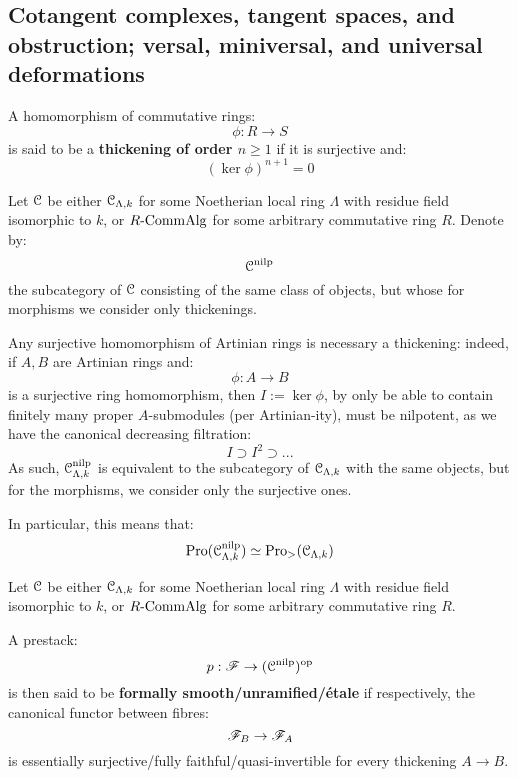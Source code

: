         \subsection{Cotangent complexes, tangent spaces, and obstruction; versal, miniversal, and universal deformations}
            \begin{definition}[Thickenings] \label{def: thickenings}
                A homomorphism of commutative rings:
                    $$\phi: R \to S$$
                is said to be a \textbf{thickening of order $n \geq 1$} if it is surjective and:
                    $$(\ker \phi)^{n + 1} = 0$$
            \end{definition}
            \begin{convention}
                Let $\mathcal{C}$ be either $\mathcal{C}_{\Lambda, k}$ for some Noetherian local ring $\Lambda$ with residue field isomorphic to $k$, or $R\text{-}\mathrm{Comm}\mathrm{Alg}$ for some arbitrary commutative ring $R$. Denote by:
                    $$\mathcal{C}^{\mathrm{nilp}}$$
                the subcategory of $\mathcal{C}$ consisting of the same class of objects, but whose for morphisms we consider only thickenings.
            \end{convention}
            \begin{remark}
                Any surjective homomorphism of Artinian rings is necessary a thickening: indeed, if $A, B$ are Artinian rings and:
                    $$\phi: A \to B$$
                is a surjective ring homomorphism, then $I := \ker \phi$, by only be able to contain finitely many proper $A$-submodules (per Artinian-ity), must be nilpotent, as we have the canonical decreasing filtration:
                    $$I \supset I^2 \supset ...$$
                As such, $\mathcal{C}_{\Lambda, k}^{\mathrm{nilp}}$ is equivalent to the subcategory of $\mathcal{C}_{\Lambda, k}$ with the same objects, but for the morphisms, we consider only the surjective ones.

                In particular, this means that:
                    $$\mathrm{Pro}(\mathcal{C}_{\Lambda, k}^{\mathrm{nilp}}) \simeq \mathrm{Pro}_{>}(\mathcal{C}_{\Lambda, k})$$
            \end{remark}
            \begin{definition} \label{def: formally_smooth_unramified_and_etale_prestacks}
                Let $\mathcal{C}$ be either $\mathcal{C}_{\Lambda, k}$ for some Noetherian local ring $\Lambda$ with residue field isomorphic to $k$, or $R\text{-}\mathrm{Comm}\mathrm{Alg}$ for some arbitrary commutative ring $R$.
                
                A prestack:
                    $$p: \mathscr{F} \to (\mathcal{C}^{\mathrm{nilp}})^{\mathrm{op}}$$
                is then said to be \textbf{formally smooth/unramified/\'etale} if respectively, the canonical functor between fibres:
                    $$\mathscr{F}_B \to \mathscr{F}_A$$
                is essentially surjective/fully faithful/quasi-invertible for every thickening $A \to B$.
            \end{definition}
